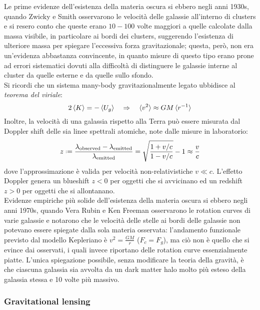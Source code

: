 Le prime evidenze dell'esistenza della materia oscura si ebbero negli anni 1930s, quando Zwicky e Smith osservarono le velocità delle galassie all'interno di clusters e si resero conto che queste erano $ 10-100 $ volte maggiori a quelle calcolate dalla massa visibile, in particolare ai bordi dei clusters, suggerendo l'esistenza di ulteriore massa per spiegare l'eccessiva forza gravitazionale; questa, però, non era un'evidenza abbastanza convincente, in quanto misure di questo tipo erano prone ad errori sistematici dovuti alla difficoltà di distinguere le galassie interne al cluster da quelle esterne e da quelle sullo sfondo.\\
Si ricordi che un sistema many-body gravitazionalmente legato ubbidisce al \textit{teorema del viriale}:
\begin{equation}
	2 \braket{K} = - \braket{U_g}
	\quad \Rightarrow \quad
	\braket{v^2} \approx G M \braket{r^{-1}}
	\label{eq:11.1}
\end{equation}
Inoltre, la velocità di una galassia rispetto alla Terra può essere misurata dal Doppler shift delle sia linee spettrali atomiche, note dalle misure in laboratorio:
\begin{equation}
	z \defeq \frac{\lambda_{\text{observed}} - \lambda_{\text{emitted}}}{\lambda_{\text{emitted}}} = \sqrt{\frac{1 + v/c}{1 - v/c}} - 1 \approx \frac{v}{c}
	\label{eq:11.2}
\end{equation}
dove l'approssimazione è valida per velocità non-relativistiche $ v \ll c $. L'effetto Doppler genera un blueshift $ z < 0 $ per oggetti che si avvicinano ed un redshift $ z > 0 $ per oggetti che si allontanano.\\
Evidenze empiriche più solide dell'esistenza della materia oscura si ebbero negli anni 1970s, quando Vera Rubin e Ken Freeman osservarono le rotation curves di varie galassie e notarono che le velocità delle stelle ai bordi delle galassie non potevano essere spiegate dalla sola materia osservata: l'andamento funzionale previsto dal modello Kepleriano è $ v^2 = \frac{GM}{r} $ ($ F_c = F_g $), ma ciò non è quello che si evince dai osservati, i quali invece riportano delle rotation curve essenzialmente piatte. L'unica spiegazione possibile, senza modificare la teoria della gravità, è che ciascuna galassia sia avvolta da un dark matter halo molto più esteso della galassia stessa e 10 volte più massivo.

\subsubsection{Gravitational lensing}

